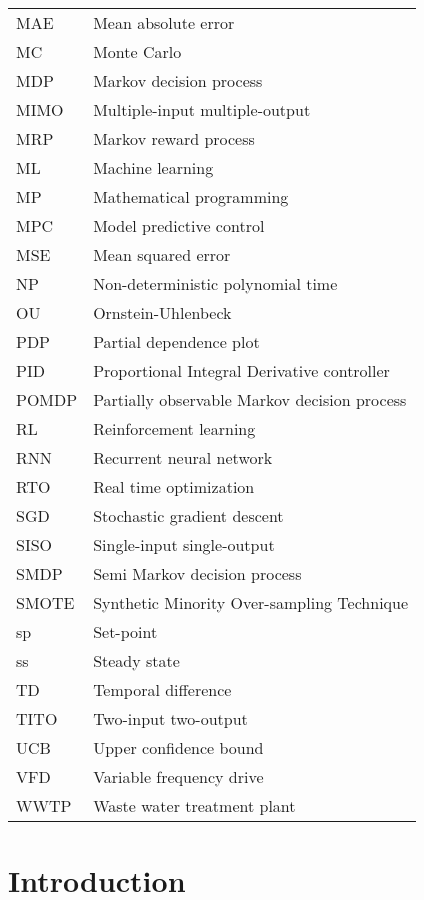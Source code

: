 \documentclass[12pt]{report}
\begin{document}
\newpage
\begin{tabular}{@{}ll}
MAE & Mean absolute error \\
MC & Monte Carlo \\
MDP & Markov decision process \\
MIMO & Multiple-input multiple-output \\
MRP & Markov reward process \\
ML & Machine learning \\
MP & Mathematical programming \\
MPC & Model predictive control \\
MSE & Mean squared error \\
NP & Non-deterministic polynomial time \\
OU & Ornstein-Uhlenbeck \\
PDP & Partial dependence plot \\
PID & Proportional Integral Derivative controller \\
POMDP & Partially observable Markov decision process \\
RL & Reinforcement learning \\
RNN & Recurrent neural network \\
RTO & Real time optimization \\
SGD & Stochastic gradient descent \\
SISO & Single-input single-output \\
SMDP & Semi Markov decision process \\
SMOTE & Synthetic Minority Over-sampling Technique \\
sp & Set-point \\
ss & Steady state \\
TD & Temporal difference \\
TITO & Two-input two-output \\
UCB & Upper confidence bound \\
VFD & Variable frequency drive \\
WWTP & Waste water treatment plant \\
\end{tabular}

\newpage
\pagestyle{fancy}
\fancyhead[R]{\rightmark}

\chapter{Introduction}

\end{document}
